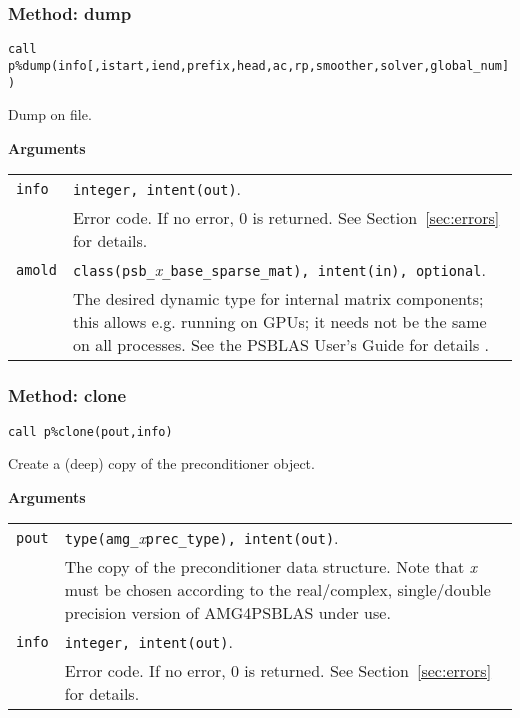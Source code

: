 \subsubsection{Method: dump}

\begin{center}
\verb|call p%dump(info[,istart,iend,prefix,head,ac,rp,smoother,solver,global_num])|\\
\end{center}

\noindent
Dump on file.

{\baselineskip\noindent\large\bfseries Arguments} \smallskip

\begin{tabular}{p{1.2cm}p{12cm}}
\verb|info|   & \verb|integer, intent(out)|.\\
              & Error code. If no error, 0 is returned. See Section~\ref{sec:errors} for details.\\
\verb|amold| & \verb|class(psb_|\emph{x}\verb|_base_sparse_mat), intent(in), optional|. \\
 & The desired dynamic type for internal matrix
  components; this allows e.g. running on GPUs; it needs not be the
  same on all processes. See the PSBLAS User's Guide for
  details \cite{PSBLASGUIDE}. \\
\end{tabular}


\subsubsection{Method: clone}

\begin{center}
\verb|call p%clone(pout,info)|\\
\end{center}

\noindent
Create a (deep) copy of the preconditioner object.

{\baselineskip\noindent\large\bfseries Arguments} \smallskip

\begin{tabular}{p{1.2cm}p{12cm}}
\verb|pout|  & \verb|type(amg_|\emph{x}\verb|prec_type), intent(out)|.\\
              & The copy of the preconditioner data structure. Note
                that \emph{x} must be chosen according
                to the real/complex, single/double precision version of AMG4PSBLAS under use.\\
\verb|info|   & \verb|integer, intent(out)|.\\
              & Error code. If no error, 0 is returned. See Section~\ref{sec:errors} for details.\\
\end{tabular}



